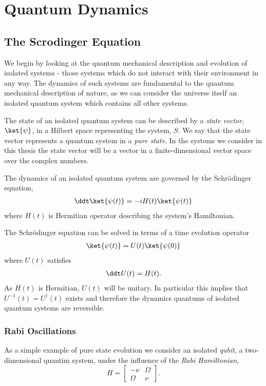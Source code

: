 \chapter{Quantum Dynamics} 
\label{ch:QuantumDynamics}

\section{The Scrodinger Equation}

We begin by looking at the quantum mechanical description and evolution of isolated systems - those systems which do not interact with their environment in any way. The dynamics of such systems are fundamental to the quantum mechanical description of nature, as we can consider the universe itself an isolated quantum system which contains all other systems. 

The state of an isolated quantum system can be described by a \textit{state vector}, $\ket{\psi}$, in a Hilbert space representing the system, $S$. We say that the state vector represents a quantum system in a \textit{pure state}. In the systems we consider in this thesis the state vector will be a vector in a finite-dimensional vector space over the complex numbers. 

The dynamics of an isolated quantum system are governed by the Schr\"odinger equation,
\begin{align}
  \label{qd:schrodinger_eq}
  \ddt \ket{\psi(t)} = -i H(t) \ket{\psi(t)}
\end{align}
where $H(t)$ is Hermitian operator describing the system's Hamiltonian.

The Schr\"odinger equation can be solved in terms of a time evolution operator
\begin{align}
  \ket{\psi(t)} = U(t)\ket{\psi(0)}
\end{align}
where $U(t)$ satisfies
\begin{align}
  \ddt U(t) = H(t).
\end{align}
As $H(t)$ is Hermitian, $U(t)$ will be unitary. In particular this implies that $U^{-1}(t) = U^\dagger(t)$ exists and therefore the dynamics quantums of isolated quantum systems are reversible.

\subsection{Rabi Oscillations}

As a simple example of pure state evolution we consider an isolated \textit{qubit}, a two-dimensional quantim system, under the influence of the \textit{Rabi Hamiltonian},
\begin{equation}
H = 
\begin{bmatrix}
  -\nu & \Omega \\
  \Omega & \nu 
\end{bmatrix}.
\end{equation}

